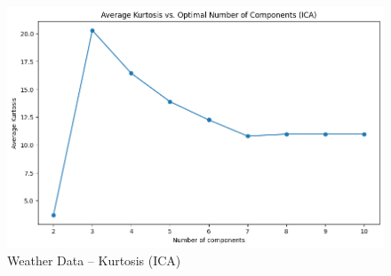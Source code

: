\documentclass[conference]{IEEEtran}
\begin{document}
\begin{figure}
    \centering
    \includegraphics[width=0.9\linewidth]{figures//weather_figures/step_2c.png}
    \caption{Weather Data -- Kurtosis (ICA)}
    \label{fig:7_weather_kurtosis
}
\end{figure}
\end{document}
